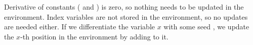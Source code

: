 \begin{code}
\AgdaSpace{}%
\AgdaSpace{}%
\AgdaSymbol{(}\AgdaSpace{}%
\AgdaSpace{}%
\AgdaSymbol{(}\AgdaSpace{}%
\AgdaSpace{}%
\AgdaSymbol{(}\AgdaSpace{}%
\AgdaSymbol{)}\AgdaSpace{}%
\AgdaSymbol{(}\AgdaSpace{}%
\AgdaSymbol{)))}\<%
\\
%
\\[\AgdaEmptyExtraSkip]%
%
\>[2]\AgdaSpace{}%
\AgdaSpace{}%
\AgdaSpace{}%
\AgdaSpace{}%
\AgdaSymbol{=}\AgdaSpace{}%
\AgdaSpace{}%
\AgdaSpace{}%
\AgdaOperator{\AgdaFunction{\$}}\AgdaSpace{}%
\AgdaSpace{}%
\AgdaOperator{\AgdaFunction{\$}}\AgdaSpace{}%
\AgdaSpace{}%
\AgdaSymbol{(}\AgdaSpace{}%
\AgdaSpace{}%
\AgdaSpace{}%
\AgdaSymbol{)}\<%
\\
%
\\[\AgdaEmptyExtraSkip]%
%
\>[2]\AgdaSpace{}%
\AgdaSpace{}%
\AgdaSymbol{(}\AgdaSpace{}%
\AgdaSymbol{(}\AgdaSpace{}%
\AgdaSpace{}%
\AgdaSymbol{))}%
\>[22]\AgdaSymbol{=}\AgdaSpace{}%
\AgdaSpace{}%
\AgdaOperator{\AgdaFunction{\$}}\AgdaSpace{}%
\AgdaSpace{}%
\AgdaSpace{}%
\AgdaSymbol{(}\AgdaSpace{}%
\AgdaSymbol{(}\AgdaSpace{}%
\AgdaSymbol{)}\AgdaSpace{}%
\AgdaSymbol{(}\AgdaSpace{}%
\AgdaSymbol{)}\AgdaSpace{}%
\AgdaSymbol{(}\AgdaSpace{}%
\AgdaSpace{}%
\AgdaSymbol{))}\<%
\\
%
\>[2]\AgdaSpace{}%
\AgdaSpace{}%
\AgdaSymbol{(}\AgdaSpace{}%
\AgdaSpace{}%
\AgdaSymbol{)}%
\>[22]\AgdaSymbol{=}\AgdaSpace{}%
\AgdaSpace{}%
\AgdaSpace{}%
\AgdaSymbol{(}\AgdaSpace{}%
\AgdaOperator{\AgdaFunction{\$}}\AgdaSpace{}%
\AgdaSpace{}%
\AgdaSymbol{(}\AgdaSpace{}%
\AgdaSymbol{)}\AgdaSpace{}%
\AgdaSymbol{(}\AgdaSpace{}%
\AgdaSpace{}%
\AgdaSymbol{(}\AgdaSpace{}%
\AgdaSymbol{(}\AgdaSpace{}%
\AgdaSymbol{))))}\<%
\end{code}
Derivative of constants ( and )
is zero, so nothing needs to be updated in the environment.  Index variables are
not stored in the environment, so no updates are needed either.  If we differentiate
the variable $x$ with some seed , we update the $x$-th position in the environment
by adding  to it.

